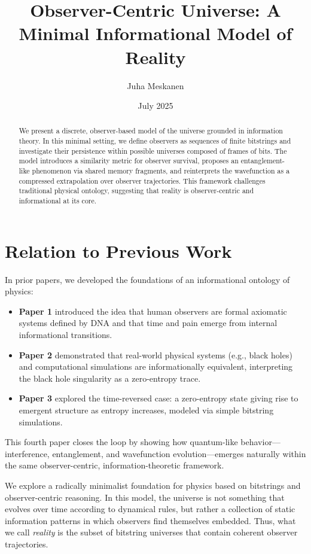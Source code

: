 \documentclass[12pt]{article}
\title{Observer-Centric Universe: A Minimal Informational Model of Reality}
\author{Juha Meskanen}
\date{July 2025}
\begin{document}
\maketitle

\begin{abstract}
    We present a discrete, observer-based model of the universe grounded in information theory.
    In this minimal setting, we define observers as sequences of finite bitstrings and investigate their persistence within possible universes composed of frames of bits.
    The model introduces a similarity metric for observer survival, proposes an entanglement-like phenomenon via shared memory fragments, and reinterprets the wavefunction as a compressed extrapolation over observer trajectories. This framework challenges traditional physical ontology, suggesting that reality is observer-centric and informational at its core.
\end{abstract}


\section*{Relation to Previous Work}

In prior papers, we developed the foundations of an informational ontology of physics:

\begin{itemize}
    \item \textbf{Paper 1} introduced the idea that human observers are formal axiomatic systems defined by DNA and that time and pain emerge from internal informational transitions.
    \item \textbf{Paper 2} demonstrated that real-world physical systems (e.g., black holes) and computational simulations are informationally equivalent, interpreting the black hole singularity as a zero-entropy trace.
    \item \textbf{Paper 3} explored the time-reversed case: a zero-entropy state giving rise to emergent structure as entropy increases, modeled via simple bitstring simulations.
\end{itemize}

This fourth paper closes the loop by showing how quantum-like behavior—interference, entanglement, and wavefunction evolution—emerges naturally within the same observer-centric, information-theoretic framework.

We explore a radically minimalist foundation for physics based on bitstrings and observer-centric reasoning. In this model, the universe is not something that evolves over time according to dynamical rules, but rather a collection of static information patterns in which observers find themselves embedded. Thus, what we call \emph{reality} is the subset of bitstring universes that contain coherent observer trajectories.
\end{document}
